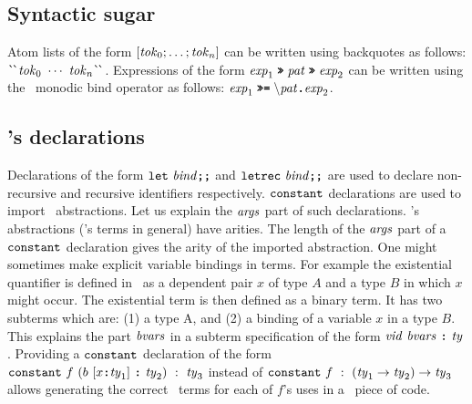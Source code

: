 \documentclass[final]{article}
\begin{document}




\subsection{Syntactic sugar}

Atom lists of the form $\CONSlistn{\METAatom_0}{\METAatom_n}$ can
be written using backquotes as follows: $\CONSatomsn{\METAatom_0}{\METAatom_n}$.
%
Expressions of the form
$\CONSbindingexp{\METAexp_1}{\METApat}{\METAexp_2}$ can be written
using the \haskell\ monodic bind operator as follows:
$\CONSmonbindexp{\METAexp_1}{\CONSlamexp{\METApat}{\METAexp_2}}$.



\subsection{\eml's declarations}
\label{sec:esharp-declarations}


Declarations of the form $\CONSletdec{\METAbind}$ and
$\CONSletrecdec{\METAbind}$ are used to declare non-recursive and
recursive identifiers respectively.  $\CONS{constant}$ declarations are
used to import \nuprl\ abstractions.  Let us explain the $\METAargs$
part of such declarations.  \nuprl's abstractions (\nuprl's terms in
general) have arities.  The length of the $\METAargs$ part of a
$\CONS{constant}$ declaration gives the arity of the imported
abstraction.  One might sometimes make explicit variable bindings in
terms.  For example the existential quantifier is defined in
\nuprl\ as a dependent pair $x$ of type $A$ and a type $B$ in which
$x$ might occur.  The existential term is then defined as a binary
term.  It has two subterms which are: (1) a type A, and (2) a
binding of a variable $x$ in a type $B$.  This explains the part
$\METAbvars$ in a subterm specification of the form
$\CONSoneargbvars{\METAvid}{\METAty}{\METAbvars}$.
Providing a $\CONS{constant}$ declaration of the form
$\CONSconsargsdec
{f}
{\CONSargs
  {\CONSoneargbvars
    {b}
    {\METAty_2}
    {\CONSbvars
      {\CONSonebvar
        {x}
        {\METAty_1}
      }
    }
  }
}
{\METAty_3}$
instead of
$\CONSconsdec
{f}
{\CONSarrowty
  {(\CONSarrowty{\METAty_1}{\METAty_2})}
  {\METAty_3}
}$
allows generating the correct \nuprl\ terms for each of $f$'s uses in
a \eml\ piece of code.
%
\end{document}
